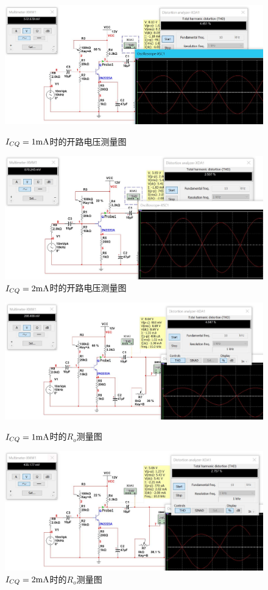 \documentclass[UTF8,a4paper]{ctexart}
\begin{document}
\begin{figure}
\centering
\includegraphics[width=\textwidth]{R02.JPG}
\caption{$I_{CQ}=1\rm{mA}$时的开路电压测量图}
\label{Ri1}
\includegraphics[width=\textwidth]{R01.JPG}
\caption{$I_{CQ}=2\rm{mA}$时的开路电压测量图}
\label{Ri2}
\end{figure}
\begin{figure}
\centering
\includegraphics[width=\textwidth]{R002.JPG}
\caption{$I_{CQ}=1\rm{mA}$时的$R_o$测量图}
\label{Ri1}
\includegraphics[width=\textwidth]{R001.JPG}
\caption{$I_{CQ}=2\rm{mA}$时的$R_o$测量图}
\label{Ri2}
\end{figure}
\end{document}
